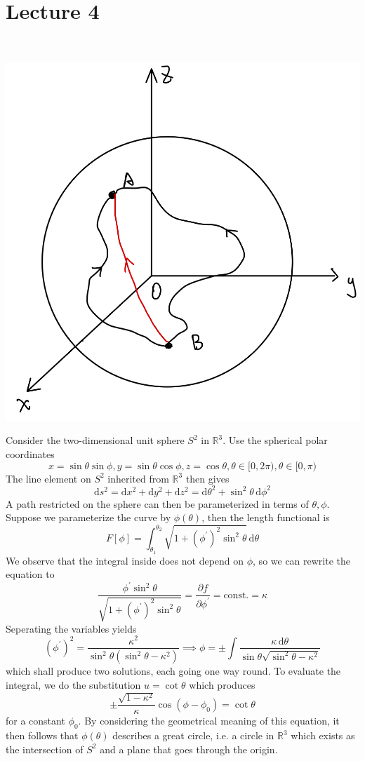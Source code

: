 \documentclass{article}
\begin{document}
\part*{Lecture 4}
\begin{example}\ 
    \begin{center}
        \includegraphics[scale=0.13]{geodesics_sphere.jpeg}
    \end{center}
    Consider the two-dimensional unit sphere $S^2$ in $\mathbb R^3$.
    Use the spherical polar coordinates
    $$x=\sin\theta\sin\phi,y=\sin\theta\cos\phi,z=\cos\theta,\theta\in [0,2\pi),\theta\in[0,\pi)$$
    The line element on $S^2$ inherited from $\mathbb R^3$ then gives
    $$\mathrm ds^2=\mathrm dx^2+\mathrm dy^2+\mathrm dz^2=\mathrm d\theta^2+\sin^2\theta\,\mathrm d\phi^2$$
    A path restricted on the sphere can then be parameterized in terms of $\theta,\phi$.
    Suppose we parameterize the curve by $\phi(\theta)$, then the length functional is
    $$F[\phi]=\int_{\theta_1}^{\theta_2}\sqrt{1+(\phi^\prime)^2\sin^2\theta}\,\mathrm d\theta$$
    We observe that the integral inside does not depend on $\phi$, so we can rewrite the equation to
    $$\frac{\phi^\prime\sin^2\theta}{\sqrt{1+(\phi^\prime)^2\sin^2\theta}}=\frac{\partial f}{\partial \phi^\prime}=\text{const.}=\kappa$$
    Seperating the variables yields
    $$(\phi^\prime)^2=\frac{\kappa^2}{\sin^2\theta(\sin^2\theta-\kappa^2)}\implies\phi=\pm\int\frac{\kappa\,\mathrm d\theta}{\sin\theta\sqrt{\sin^2\theta-\kappa^2}}$$
    which shall produce two solutions, each going one way round.
    To evaluate the integral, we do the substitution $u=\cot\theta$ which produces
    $$\pm\frac{\sqrt{1-\kappa^2}}{\kappa}\cos(\phi-\phi_0)=\cot\theta$$
    for a constant $\phi_0$.
    By considering the geometrical meaning of this equation, it then follows that $\phi(\theta)$ describes a great circle, i.e. a circle in $\mathbb R^3$ which exists as the intersection of $S^2$ and a plane that goes through the origin.
\end{example}
\end{document}
